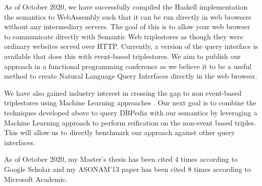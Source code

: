 \documentclass[../main.tex]{subfiles}
\begin{document}
\begin{refsection}
    As of October 2020, we have successfully compiled the Haskell implementation the semantics to WebAssembly such that it can be run directly in web browsers without any intermediary servers.  The goal of this is to allow your web browser to communicate directly with Semantic Web triplestores as though they were ordinary websites served over HTTP.  Currently, a version of the query interface is available that does this with event-based triplestores.  We aim to publish our approach in a functional programming conference as we believe it to be a useful method to create Natural Language Query Interfaces directly in the web browser.

    We have also gained industry interest in crossing the gap to non event-based triplestores using Machine Learning approaches \cite{timbr}.  Our next goal is to combine the techniques developed above to query DBPedia with our semantics by leveraging a Machine Learning approach to perform reification on the non-event based triples.  This will allow us to directly benchmark our approach against other query interfaces.

    As of October 2020, my Master's thesis \cite{peelar2016accommodating} has been cited 4 times according to Google Scholar and my ASONAM'13 paper has been cited 8 times according to Microsoft Academic.



\printbibliography[heading=subbibintoc]
\end{refsection}
\end{document}
